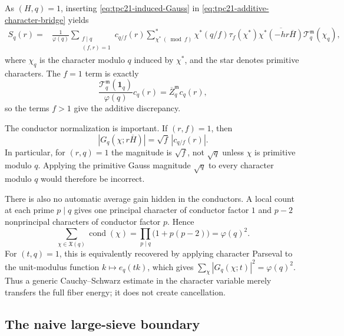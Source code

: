 As \((H,q)=1\), inserting \eqref{eq:tpc21-induced-Gauss} in
\eqref{eq:tpc21-additive-character-bridge} yields
\begin{align}
 S_q(r)
 ={}&\frac1{\varphi(q)}
 \sum_{\substack{f\mid q\\(f,r)=1}}c_{q/f}(r)
 \sum_{\chi^*\ (\bmod f)}^{*}
 \chi^*(q/f)\tau_f(\chi^*)
 \overline{\chi^*(-hr\overline H)}
 \mathcal T_q^{\mathfrak m}(\chi_q),
 \label{eq:tpc21-conductor-expansion}
\end{align}
where \(\chi_q\) is the character modulo \(q\) induced by \(\chi^*\),
and the star denotes primitive characters.  The \(f=1\) term is exactly
\begin{equation}
 \frac{\mathcal T_q^{\mathfrak m}(\mathbf1_q)}{\varphi(q)}c_q(r)
 =\overline Z_q^{\mathfrak m}c_q(r),
 \label{eq:tpc21-conductor-principal-term}
\end{equation}
so the terms \(f>1\) give the additive discrepancy.

The conductor normalization is important.  If \((r,f)=1\), then
\begin{equation}
 |G_q(\chi;r\overline H)|
 =\sqrt f\,|c_{q/f}(r)|.
 \label{eq:tpc21-Gauss-conductor-size}
\end{equation}
In particular, for \((r,q)=1\) the magnitude is \(\sqrt f\), not
\(\sqrt q\) unless \(\chi\) is primitive modulo \(q\).  Applying the
primitive Gauss magnitude \(\sqrt q\) to every character modulo \(q\)
would therefore be incorrect.

There is also no automatic average gain hidden in the conductors.  A
local count at each prime \(p\mid q\) gives one principal character of
conductor factor \(1\) and \(p-2\) nonprincipal characters of conductor
factor \(p\).  Hence
\begin{equation}
 \sum_{\chi\in\mathfrak X(q)}\operatorname{cond}(\chi)
 =\prod_{p\mid q}\bigl(1+p(p-2)\bigr)
 =\varphi(q)^2.
 \label{eq:tpc21-conductor-mass}
\end{equation}
For \((t,q)=1\), this is equivalently recovered by applying character
Parseval to the unit-modulus function \(k\mapsto e_q(tk)\), which gives
\(\sum_\chi|G_q(\chi;t)|^2=\varphi(q)^2\).  Thus a generic
Cauchy--Schwarz estimate in the character variable merely transfers
the full fiber energy; it does not create cancellation.

\subsection{The naive large-sieve boundary}

